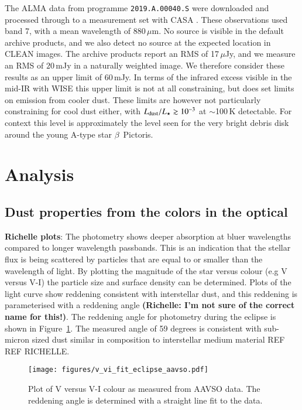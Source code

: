 \documentclass{aa}
\begin{document}
The ALMA data from programme \texttt{2019.A.00040.S} were downloaded and processed through to a measurement set with CASA \citep{2007ASPC..376..127M}. These observations used band 7, with a mean wavelength of 880\,$\mu$m.
%
No source is visible in the default archive products, and we also detect no source at the expected location in CLEAN images.
%
The archive products report an RMS of 17\,$\mu$Jy, and we measure an RMS of $20$\,mJy in a naturally weighted image. We therefore consider these results as an upper limit of $60$\,mJy.
%
In terms of the infrared excess visible in the mid-IR with WISE this upper limit is not at all constraining, but does set limits on emission from cooler dust.
%
These limits are however not particularly constraining for cool dust either, with $L_{\rm dust}/L_\star \gtrsim 10^{-3}$ at $\sim$100\,K detectable. For context this level is approximately the level seen for the very bright debris disk around the young A-type star $\beta$~Pictoris.

\section{Analysis}\label{sec:dustcloud}

\subsection{Dust properties from the colors in the optical}

{\bf Richelle plots}: The photometry shows deeper absorption at bluer wavelengths compared to longer wavelength passbands.
%
This is an indication that the stellar flux is being scattered by particles that are equal to or smaller than the wavelength of light.
%
By plotting the magnitude of the star versus colour (e.g V versus V-I) the particle size and surface density can be determined.
%
Plots of the light curve show reddening consistent with interstellar dust, and this reddening is parameterised with a reddening angle {\bf (Richelle: I'm not sure of the correct name for this!)}.
%
The reddening angle for photometry during the eclipse is shown in Figure~\ref{fig:reddenangle}.
%
The measured angle of 59 degrees is consistent with sub-micron sized dust similar in composition to interstellar medium material REF REF RICHELLE.

\begin{figure}
    \begin{centering}
        \texttt{[image: figures/v\_vi\_fit\_eclipse\_aavso.pdf]}
\caption{Plot of V versus V-I colour as measured from AAVSO data. The reddening angle is determined with a straight line fit to the data.}
        \label{fig:reddenangle}
    \end{centering}
\end{figure}
\end{document}
